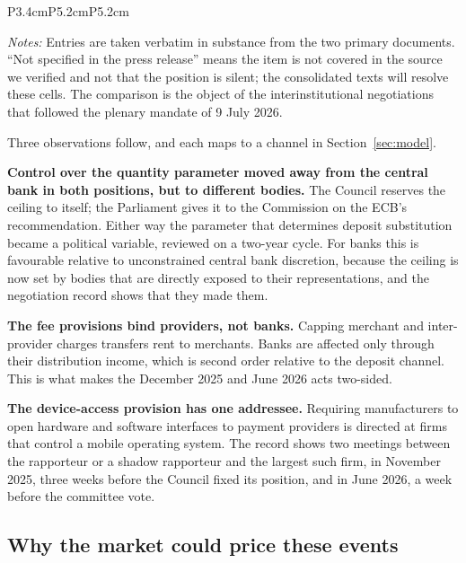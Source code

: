 \documentclass[11pt]{article}
\theoremstyle{plain}\newtheorem{proposition}{Proposition}
\begin{document}
\begin{table}[t]
\begin{threeparttable}
\begin{tabular}{P{3.4cm}P{5.2cm}P{5.2cm}}
\bottomrule
\end{tabular}
\begin{tablenotes}\footnotesize
\item \textit{Notes:} Entries are taken verbatim in substance from the two primary documents. ``Not specified in the press release'' means the item is not covered in the source we verified and not that the position is silent; the consolidated texts will resolve these cells. The comparison is the object of the interinstitutional negotiations that followed the plenary mandate of 9 July 2026.
\end{tablenotes}
\end{threeparttable}
\end{table}

Three observations follow, and each maps to a channel in Section~\ref{sec:model}.

\textbf{Control over the quantity parameter moved away from the central bank in both positions, but to different bodies.} The Council reserves the ceiling to itself; the Parliament gives it to the Commission on the ECB's recommendation. Either way the parameter that determines deposit substitution became a political variable, reviewed on a two-year cycle. For banks this is favourable relative to unconstrained central bank discretion, because the ceiling is now set by bodies that are directly exposed to their representations, and the negotiation record shows that they made them.

\textbf{The fee provisions bind providers, not banks.} Capping merchant and inter-provider charges transfers rent to merchants. Banks are affected only through their distribution income, which is second order relative to the deposit channel. This is what makes the December 2025 and June 2026 acts two-sided.

\textbf{The device-access provision has one addressee.} Requiring manufacturers to open hardware and software interfaces to payment providers is directed at firms that control a mobile operating system. The record shows two meetings between the rapporteur or a shadow rapporteur and the largest such firm, in November 2025, three weeks before the Council fixed its position, and in June 2026, a week before the committee vote.

\subsection{Why the market could price these events}
\end{document}
